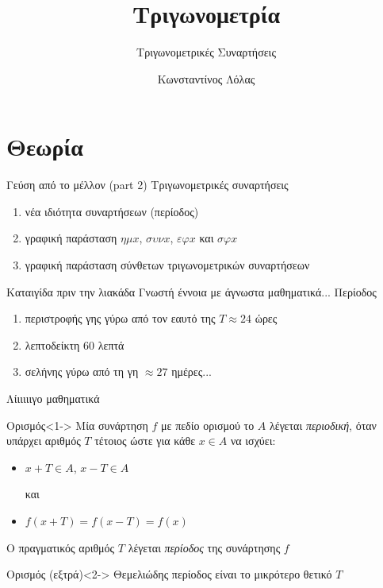\documentclass{presentation}
\title{Τριγωνομετρία}
\subtitle{Τριγωνομετρικές Συναρτήσεις}
\author[Λόλας]{Κωνσταντίνος Λόλας}
\date{}
\begin{document}
\begin{frame}
  \titlepage
\end{frame}

\section{Θεωρία}
\begin{frame}{Γεύση από το μέλλον (part 2)}
  Τριγωνομετρικές συναρτήσεις
  \begin{enumerate}
    \item<1-> νέα ιδιότητα συναρτήσεων (περίοδος)
    \item<2-> γραφική παράσταση $ημx$, $συνx$, $εφx$ και $σφx$
    \item<3-> γραφική παράσταση σύνθετων τριγωνομετρικών συναρτήσεων
  \end{enumerate}
\end{frame}

\begin{frame}{Καταιγίδα πριν την λιακάδα}
  Γνωστή έννοια με άγνωστα μαθηματικά... Περίοδος
  \begin{enumerate}
    \item<1-> περιστροφής γης γύρω από τον εαυτό της $T\approx 24$ ώρες
    \item<2-> λεπτοδείκτη $60$ λεπτά
    \item<3-> σελήνης γύρω από τη γη $\approx 27$ ημέρες...
  \end{enumerate}
\end{frame}

\begin{frame}{Λίιιιιιγο μαθηματικά}
  \begin{block}{Ορισμός}<1->
    Μία συνάρτηση $f$ με πεδίο ορισμού το $Α$ λέγεται \emph{περιοδική}, όταν υπάρχει αριθμός $Τ$ τέτοιος ώστε για κάθε $x\in Α$ να ισχύει:
    \begin{itemize}
      \item $x+Τ\in Α$, $x-Τ\in Α$

            και

      \item $f(x+Τ)=f(x-Τ)=f(x)$
    \end{itemize}
    Ο πραγματικός αριθμός $Τ$ λέγεται \emph{περίοδος} της συνάρτησης $f$
  \end{block}

  \begin{block}{Ορισμός (εξτρά)}<2->
    Θεμελιώδης περίοδος είναι το μικρότερο θετικό $Τ$
  \end{block}

\end{frame}
\end{document}
